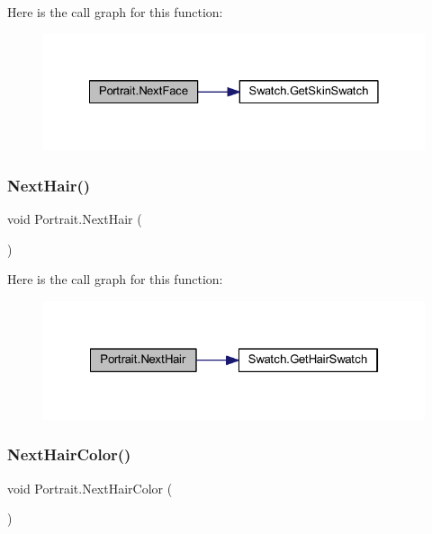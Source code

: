 Here is the call graph for this function\+:
\nopagebreak
\begin{figure}[H]
\begin{center}
\leavevmode
\includegraphics[width=328pt]{class_portrait_aaa0da57aae916077e97d6c9d0a48aa4d_cgraph}
\end{center}
\end{figure}
\mbox{\label{class_portrait_ae14081edd428a837484936bc56350a12}} 
\subsubsection{\texorpdfstring{NextHair()}{NextHair()}}
{\footnotesize\ttfamily void Portrait.\+Next\+Hair (\begin{DoxyParamCaption}{ }\end{DoxyParamCaption})}

Here is the call graph for this function\+:
\nopagebreak
\begin{figure}[H]
\begin{center}
\leavevmode
\includegraphics[width=322pt]{class_portrait_ae14081edd428a837484936bc56350a12_cgraph}
\end{center}
\end{figure}
\mbox{\label{class_portrait_a8117eeefced674e0a4a483745ea0053d}} 
\subsubsection{\texorpdfstring{NextHairColor()}{NextHairColor()}}
{\footnotesize\ttfamily void Portrait.\+Next\+Hair\+Color (\begin{DoxyParamCaption}{ }\end{DoxyParamCaption})}


